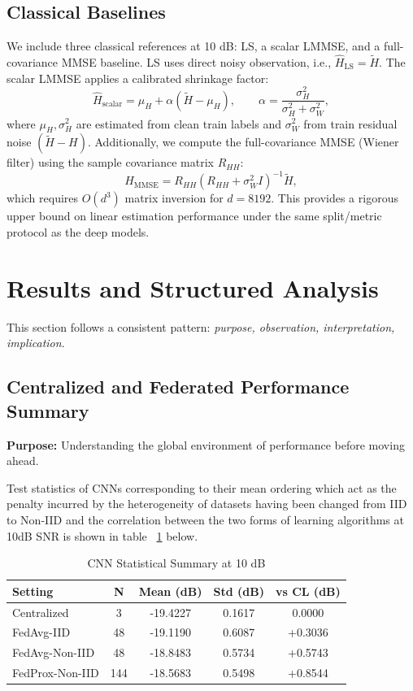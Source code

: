 \documentclass{llncs}
\begin{document}
\subsection{Classical Baselines}
We include three classical references at 10 dB: LS, a scalar LMMSE, and a full-covariance MMSE baseline. LS uses direct noisy observation, i.e., $\hat H_{\mathrm{LS}}=\tilde H$. The scalar LMMSE applies a calibrated shrinkage factor:
\begin{equation}
\hat H_{\mathrm{scalar}} = \mu_H + \alpha(\tilde H-\mu_H),\qquad
\alpha = \frac{\sigma_H^2}{\sigma_H^2+\sigma_W^2},
\end{equation}
where $\mu_H,\sigma_H^2$ are estimated from clean train labels and $\sigma_W^2$ from train residual noise $(\tilde H-H)$. Additionally, we compute the full-covariance MMSE (Wiener filter) using the sample covariance matrix $R_{HH}$:
\begin{equation}
\hat H_{\mathrm{MMSE}} = R_{HH}(R_{HH}+\sigma_W^2 I)^{-1}\tilde H,
\end{equation}
which requires $O(d^3)$ matrix inversion for $d=8192$. This provides a rigorous upper bound on linear estimation performance under the same split/metric protocol as the deep models.

\section{Results and Structured Analysis}
This section follows a consistent pattern: \textit{purpose, observation, interpretation, implication}.

\subsection{Centralized and Federated Performance Summary}
\textbf{Purpose:} Understanding the global environment of performance before moving ahead.

Test statistics of CNNs corresponding to their mean ordering which act as the penalty incurred by the heterogeneity of datasets having been changed from IID to Non-IID and the correlation between the two forms of learning algorithms at 10dB SNR is shown in table ~\ref{tab:cnn_stats} below.

\begin{table}[htbp]
\caption{CNN Statistical Summary at 10 dB}
\label{tab:cnn_stats}
\centering
\begin{tabular}{lcccc}
\toprule
Setting & N & Mean (dB) & Std (dB) & vs CL (dB) \\
\midrule
Centralized & 3 & -19.4227 & 0.1617 & 0.0000 \\
FedAvg-IID & 48 & -19.1190 & 0.6087 & +0.3036 \\
FedAvg-Non-IID & 48 & -18.8483 & 0.5734 & +0.5743 \\
FedProx-Non-IID & 144 & -18.5683 & 0.5498 & +0.8544 \\
\bottomrule
\end{tabular}
\end{table}
\end{document}
